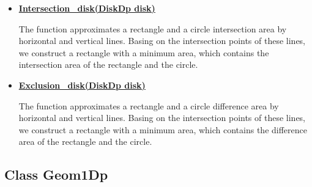 \documentclass{report}
\begin{document}
\begin{itemize}
\begin{itemize}
			\item \hyperref [Intersection]{\bfseries Intersection\_disk(DiskDp disk)} 
			
			The function approximates a rectangle and a circle intersection area by horizontal and vertical lines. Basing on the intersection points of these lines, we construct a rectangle with a minimum area, which contains the intersection area of the rectangle and the circle.
			
			\item \hyperref [Difference]{\bfseries Exclusion\_disk(DiskDp disk)} 
			
			The function approximates a rectangle and a circle difference area by horizontal and vertical lines. Basing on the intersection points of these lines, we construct a rectangle with a minimum area, which contains the difference area of the rectangle and the circle.
		\end{itemize}
	\end{itemize}


	\subsection*{Class Geom1Dp}
	\label{Geom1Dp}
	
\end{document}
